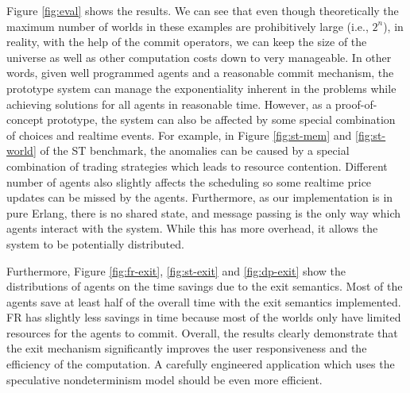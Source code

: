 Figure \ref{fig:eval} shows the results.
We can see that even though theoretically the
maximum number of worlds in these examples are prohibitively large 
(i.e., $2^n$),
in reality, with the help of the commit operators, we can keep
the size of the universe as well as other computation costs
down to very manageable. In other words, given well programmed agents and a
reasonable commit mechanism, the prototype system can manage 
the exponentiality inherent in the problems while achieving 
solutions for all agents in reasonable time. 
However, as a proof-of-concept prototype, the system can also 
be affected by some special combination of choices and realtime events. 
For example, in Figure \ref{fig:st-mem} and \ref{fig:st-world} 
of the ST benchmark, the anomalies can be caused by a special combination 
of trading strategies which leads to resource contention. 
Different number of agents also slightly affects the scheduling so 
some realtime price updates can be missed by the agents.
Furthermore, as our implementation is in pure Erlang, there is no shared
state, and message passing is the only way which agents interact with the
system. While this has more overhead, it allows the system to be potentially
distributed.

Furthermore, Figure \ref{fig:fr-exit}, \ref{fig:st-exit} and 
\ref{fig:dp-exit} show the distributions of agents on the time savings due to
the exit semantics. Most of the agents save at least half of the overall time
with the exit semantics implemented. FR has slightly less savings in time because
most of the worlds only have limited resources for the agents to commit. 
Overall, the results clearly demonstrate
that the exit mechanism significantly improves the user responsiveness and 
the efficiency of the computation. A carefully engineered
application which uses the speculative nondeterminism model
should be even more efficient.
